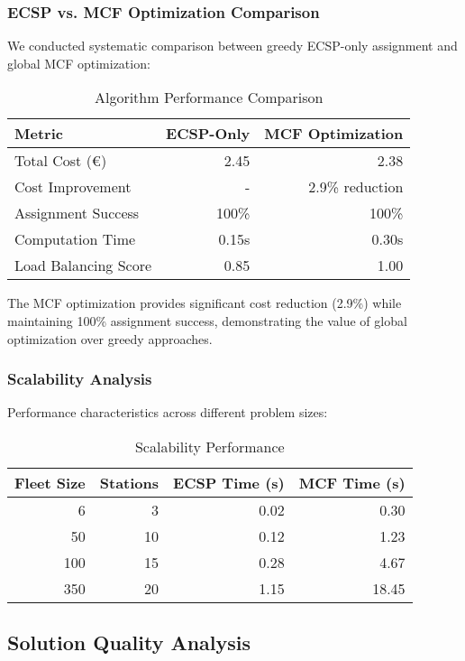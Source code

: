 \documentclass[12pt,a4paper]{article}
\begin{document}
\subsubsection{ECSP vs. MCF Optimization Comparison}
We conducted systematic comparison between greedy ECSP-only assignment and global MCF optimization:

\begin{table}[h]
\centering
\caption{Algorithm Performance Comparison}
\begin{tabular}{@{}lrr@{}}
\toprule
Metric & ECSP-Only & MCF Optimization \\
\midrule
Total Cost (€) & 2.45 & 2.38 \\
Cost Improvement & - & 2.9\% reduction \\
Assignment Success & 100\% & 100\% \\
Computation Time & 0.15s & 0.30s \\
Load Balancing Score & 0.85 & 1.00 \\
\bottomrule
\end{tabular}
\end{table}

The MCF optimization provides significant cost reduction (2.9\%) while maintaining 100\% assignment success, demonstrating the value of global optimization over greedy approaches.

\subsubsection{Scalability Analysis}
Performance characteristics across different problem sizes:

\begin{table}[h]
\centering
\caption{Scalability Performance}
\begin{tabular}{@{}rrrr@{}}
\toprule
Fleet Size & Stations & ECSP Time (s) & MCF Time (s) \\
\midrule
6 & 3 & 0.02 & 0.30 \\
50 & 10 & 0.12 & 1.23 \\
100 & 15 & 0.28 & 4.67 \\
350 & 20 & 1.15 & 18.45 \\
\bottomrule
\end{tabular}
\end{table}

\subsection{Solution Quality Analysis}
\end{document}
